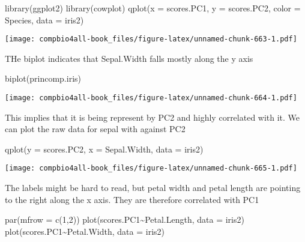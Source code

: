 \documentclass[
]{book}
\newenvironment{Shaded}{\begin{snugshade}}{\end{snugshade}}
\newcommand{\AttributeTok}[1]{\textcolor[rgb]{0.77,0.63,0.00}{#1}}
\newcommand{\DecValTok}[1]{\textcolor[rgb]{0.00,0.00,0.81}{#1}}
\newcommand{\FunctionTok}[1]{\textcolor[rgb]{0.00,0.00,0.00}{#1}}
\newcommand{\NormalTok}[1]{#1}
\newcommand{\SpecialCharTok}[1]{\textcolor[rgb]{0.00,0.00,0.00}{#1}}
\begin{document}
\begin{Shaded}
\begin{Highlighting}[]
\FunctionTok{library}\NormalTok{(ggplot2)}
\FunctionTok{library}\NormalTok{(cowplot)}
\FunctionTok{qplot}\NormalTok{(}\AttributeTok{x =}\NormalTok{ scores.PC1,}
      \AttributeTok{y =}\NormalTok{ scores.PC2,}
      \AttributeTok{color =}\NormalTok{ Species,}
      \AttributeTok{data =}\NormalTok{ iris2)}
\end{Highlighting}
\end{Shaded}

\texttt{[image: compbio4all-book\_files/figure-latex/unnamed-chunk-663-1.pdf]}

THe biplot indicates that Sepal.Width falls mostly along the y axis

\begin{Shaded}
\begin{Highlighting}[]
\FunctionTok{biplot}\NormalTok{(princomp.iris)}
\end{Highlighting}
\end{Shaded}

\texttt{[image: compbio4all-book\_files/figure-latex/unnamed-chunk-664-1.pdf]}

This implies that it is being represent by PC2 and highly correlated with it. We can plot the raw data for sepal with against PC2

\begin{Shaded}
\begin{Highlighting}[]
\FunctionTok{qplot}\NormalTok{(}\AttributeTok{y =}\NormalTok{ scores.PC2, }
      \AttributeTok{x =}\NormalTok{ Sepal.Width, }
      \AttributeTok{data =}\NormalTok{ iris2)}
\end{Highlighting}
\end{Shaded}

\texttt{[image: compbio4all-book\_files/figure-latex/unnamed-chunk-665-1.pdf]}

The labels might be hard to read, but petal width and petal length are pointing to the right along the x axis. They are therefore correlated with PC1

\begin{Shaded}
\begin{Highlighting}[]
\FunctionTok{par}\NormalTok{(}\AttributeTok{mfrow =} \FunctionTok{c}\NormalTok{(}\DecValTok{1}\NormalTok{,}\DecValTok{2}\NormalTok{))}
\FunctionTok{plot}\NormalTok{(scores.PC1}\SpecialCharTok{\textasciitilde{}}\NormalTok{Petal.Length, }\AttributeTok{data =}\NormalTok{ iris2)}
\FunctionTok{plot}\NormalTok{(scores.PC1}\SpecialCharTok{\textasciitilde{}}\NormalTok{Petal.Width, }\AttributeTok{data =}\NormalTok{ iris2)}
\end{Highlighting}
\end{Shaded}
\end{document}
